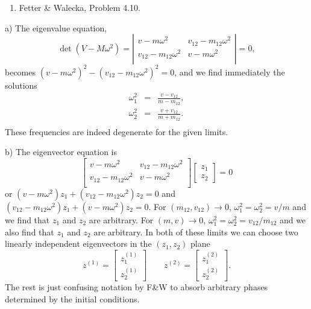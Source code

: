 \documentclass[letterpaper,11pt]{article}
\begin{document}
\begin{enumerate}[resume]
 \item Fetter \& Walecka, Problem 4.10.
\end{enumerate}
a) The eigenvalue equation,
\begin{equation*}
 \det(V - M \omega^2) = \left| \begin{array}{cc}
 v - m \omega^2 & v_{12} - m_{12} \omega^2 \\
 v_{12} - m_{12} \omega^2 & v - m \omega^2 \\
 \end{array} \right| = 0,
\end{equation*}
becomes $(v - m \omega^2)^2 - (v_{12} - m_{12} \omega^2)^2 = 0$, and we find immediately the solutions
\begin{eqnarray*}
 \omega_1^2 & = & \frac{v - v_{12}}{m - m_{12}}, \\
 \omega_2^2 & = & \frac{v + v_{12}}{m + m_{12}}. \\
\end{eqnarray*}
These frequencies are indeed degenerate for the given limits.

b) The eigenvector equation is
\begin{equation*}
 \left[ \begin{array}{cc}
 v - m \omega^2 & v_{12} - m_{12} \omega^2 \\
 v_{12} - m_{12} \omega^2 & v - m \omega^2 \\
 \end{array} \right] \left[ \begin{array}{c} z_1 \\ z_2 \end{array} \right] = 0
\end{equation*}
or $(v - m \omega^2) z_1 + (v_{12} - m_{12} \omega^2) z_2 = 0$ and $(v_{12} - m_{12} \omega^2) z_1 + (v - m \omega^2) z_2 = 0$.  For $(m_{12},v_{12}) \to 0$, $\omega_1^2 = \omega_2^2 = v/m$ and we find that $z_1$ and $z_2$ are arbitrary.  For $(m,v) \to 0$, $\omega_1^2 = \omega_2^2 = v_{12}/m_{12}$ and we also find that $z_1$ and $z_2$ are arbitrary.  In both of these limits we can choose two linearly independent eigenvectors in the $(z_1,z_2)$ plane
\begin{equation*}
 z^{(1)} = \left[ \begin{array}{c} z^{(1)}_1 \\ z^{(1)}_2 \end{array} \right] \qquad
 z^{(2)} = \left[ \begin{array}{c} z^{(2)}_1 \\ z^{(2)}_2 \end{array} \right].
\end{equation*}
The rest is just confusing notation by F\&W to absorb arbitrary phases determined by the initial conditions.
\end{document}
